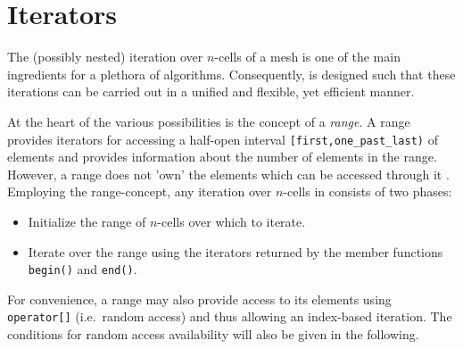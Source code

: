 \chapter{Iterators} \label{chap:iterators}

 

The (possibly nested) iteration over $n$-cells of a mesh is one of the main ingredients for a plethora of algorithms.
Consequently, {\ViennaGrid} is designed such that these iterations can be carried out in a unified and flexible, yet efficient manner.

At the heart of the various possibilities is the concept of a \emph{range}. A range provides iterators for accessing a half-open interval \texttt{[first,one\_past\_last)} of elements and provides information about the number of elements in the range. However, a range does not 'own' the elements which can be accessed through it \cite{boost}. 
Employing the range-concept, any iteration over $n$-cells in {\ViennaGrid} consists of two phases:
\begin{itemize}
 \item Initialize the range of $n$-cells over which to iterate.
 \item Iterate over the range using the iterators returned by the member functions \lstinline|begin()| and \lstinline|end()|.
\end{itemize}

For convenience, a range may also provide access to its elements using \lstinline|operator[]| (i.e.~random access) and thus allowing an index-based iteration. The conditions for random access availability will also be given in the following.


